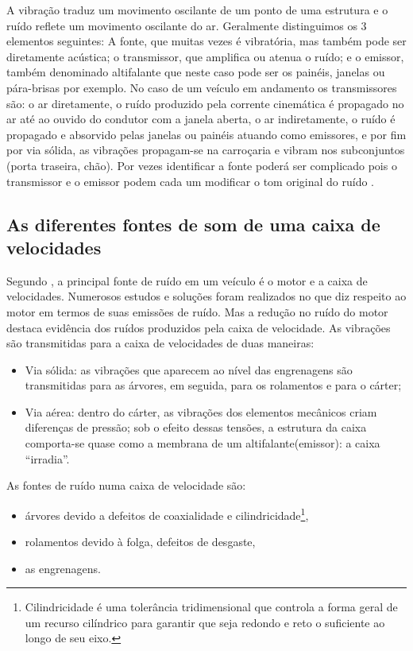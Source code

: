A vibração traduz um movimento oscilante de um ponto de uma estrutura e o ruído reflete um movimento oscilante do ar. Geralmente distinguimos os 3 elementos seguintes: A fonte, que muitas vezes é vibratória, mas também pode ser diretamente acústica; o transmissor, que amplifica ou atenua o ruído; e o emissor, também denominado altifalante que neste caso pode ser os painéis, janelas ou pára-brisas por exemplo. No caso de um veículo em andamento os transmissores são: o ar diretamente, o ruído produzido pela corrente cinemática é propagado no ar até ao ouvido do condutor com a janela aberta, o ar indiretamente, o ruído é propagado e absorvido pelas janelas ou painéis atuando como emissores, e por fim por via sólida, as vibrações propagam-se na carroçaria e vibram nos subconjuntos (porta traseira, chão). Por vezes identificar a fonte poderá ser complicado pois o transmissor e o emissor podem cada um  modificar o tom original do ruído \cite{bruitChaine}. 
\subsection{As diferentes fontes de som de uma caixa de velocidades}
Segundo \textcite{Grainolement}, a principal fonte de ruído em um veículo é o motor e a caixa de velocidades. Numerosos estudos e soluções foram realizados no que diz respeito ao motor em termos de suas emissões de ruído. Mas a redução no ruído do motor destaca evidência dos ruídos produzidos pela caixa de velocidade. As vibrações são transmitidas para a caixa de velocidades de duas maneiras:
\begin{itemize}
\item Via sólida: as vibrações que aparecem ao nível das engrenagens são
transmitidas para as árvores, em seguida, para os rolamentos e para o cárter;
\item Via aérea: dentro do cárter, as vibrações dos elementos mecânicos criam
diferenças de pressão; sob o efeito dessas tensões, a estrutura da caixa
comporta-se quase como a membrana de um altifalante(emissor): a caixa ``irradia''.
\end{itemize}
As fontes de ruído numa caixa de velocidade são:
\begin{itemize}
\item árvores devido a defeitos de coaxialidade e cilindricidade\footnote{Cilindricidade é uma tolerância tridimensional que controla a forma geral de um recurso cilíndrico para garantir que seja redondo e reto o suficiente ao longo de seu eixo.},
\item rolamentos devido à folga, defeitos de desgaste,
\item as engrenagens.
\end{itemize}

